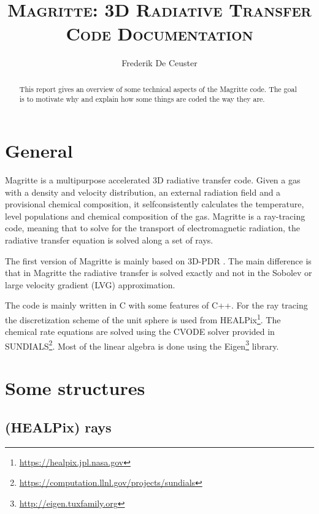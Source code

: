 \documentclass[]{article}
\title{\vspace{0cm} \huge \textsc{Magritte: 3D Radiative Transfer} \\
                \vskip3mm \textsc{Code Documentation} }
\author{\large Frederik De Ceuster}
\date{}
\begin{document}
\maketitle

\vskip5cm

\begin{abstract}
This report gives an overview of some technical aspects of the Magritte code. The goal is to motivate why and explain how some things are coded the way they are.
\end{abstract}

\vskip5cm

\tableofcontents

\newpage


\section{General}

Magritte is a multipurpose accelerated 3D radiative transfer code. Given a gas with a density and velocity distribution, an external radiation field and a provisional chemical composition, it selfconsistently calculates the temperature, level populations and chemical composition of the gas. Magritte is a ray-tracing code, meaning that to solve for the transport of electromagnetic radiation, the radiative transfer equation is solved along a set of rays.

\bigskip

The first version of Magritte is mainly based on 3D-PDR \cite{3DPDR}. The main difference is that in Magritte the radiative transfer is solved exactly and not in the Sobolev or large velocity gradient (LVG) approximation.

\bigskip

The code is mainly written in C with some features of C++. For the ray tracing the discretization scheme of the unit sphere is used from HEALPix\footnote{\url{https://healpix.jpl.nasa.gov}}. The chemical rate equations are solved using the CVODE solver provided in SUNDIALS\footnote{\url{https://computation.llnl.gov/projects/sundials}}. Most of the linear algebra is done using the Eigen\footnote{\url{http://eigen.tuxfamily.org}} library.



\section{Some structures}

\subsection{(HEALPix) rays}
\end{document}

